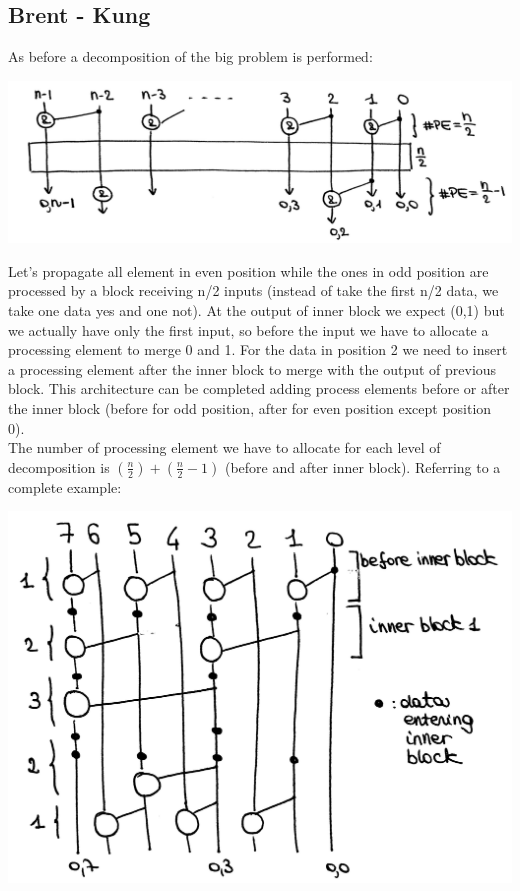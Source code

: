 \subsection{Brent - Kung}
As before a decomposition of the big problem is performed:

\begin{center}
  \includegraphics[width=0.7\linewidth]{img/img2/22}
\end{center}

Let's propagate all element in even position while the ones in odd position are processed by a block receiving n/2 inputs (instead of take the first n/2 data, we take one data yes and one not). At the output of inner block we expect (0,1) but we actually have only the first input, so before the input we have to allocate a processing element to merge 0 and 1. For the data in position 2 we need to insert a processing element after the inner block to merge with the output of previous block. This architecture can be completed adding process elements before or after the inner block (before for odd position, after for even position except position 0).\\

The number of processing element we have to allocate for each level of decomposition is $(\frac{n}{2}) + ( \frac{n}{2} -1)$ (before and after inner block). Referring to a complete example:

\begin{center}
  \includegraphics[width=0.7\linewidth]{img/img2/23}
\end{center}

